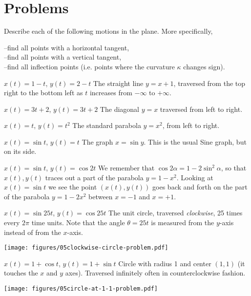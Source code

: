 \section{Problems}
\problemfont
\begin{multicols}{2}
\problem  Describe each of the following motions in the plane.  More
specifically,  

\noindent
--find all points with a horizontal tangent,\\
--find all points with a vertical tangent,\\
--find all inflection points (i.e. points where the curvature $\kappa$ changes
sign).

\subprob \(x(t) =  1-t \), \(y(t) = 2- t  \)
\answer
The straight line $y=x+1$, traversed from the top right to the bottom left
as $t$ increases from $-\infty$ to $+\infty$.
\endanswer

\subprob  \(x(t) =  3t+2 \), \(y(t) = 3t+2  \)
\answer
The diagonal $y=x$ traversed from left to right.
\endanswer

\subprob  \(x(t) =  t \), \(y(t) = t^2  \)
\answer
The standard parabola $y=x^2$, from left to right.
\endanswer

\subprob  \(x(t) =  \sin t \), \(y(t) = t  \)
\answer
The graph $x=\sin y$.  This is the usual Sine graph, but on its side.

\centerline{ }
\endanswer

\subprob  \(x(t) =  \sin t \), \(y(t) = \cos 2t  \)
\answer
We remember that $\cos2\alpha = 1-2\sin^2\alpha$, so that
$x(t), y(t)$ traces out a part of the parabola $y=1-x^2$.
Looking at $x(t) = \sin t$ we see the point $(x(t), y(t))$ goes back
and forth on the part of the parabola $y=1-2x^2$ between $x=-1$
and $x=+1$.
\endanswer

\subprob  \(x(t) =  \sin 25t \), \(y(t) = \cos 25t  \)
\answer
The unit circle, traversed \emph{clockwise}, 25 times every $2\pi$ time units.
Note that the angle $\theta = 25t$ is measured from the $y$-axis instead of from
the $x$-axis.

\begin{center}
  \texttt{[image: figures/05clockwise-circle-problem.pdf]}
\end{center}
\endanswer

\subprob  \(x(t) =  1+\cos t \), \(y(t) = 1+\sin t  \)
\answer
Circle with radius 1 and center $(1,1)$ (it touches the $x$ and $y$ axes).
Traversed infinitely often in counterclockwise fashion.
\begin{center}
  \texttt{[image: figures/05circle-at-1-1-problem.pdf]}
\end{center}
\endanswer


\end{multicols}
